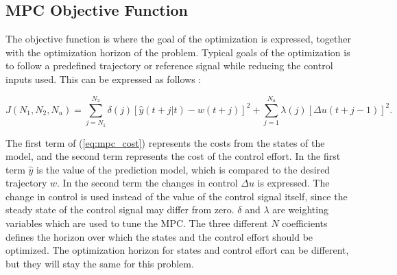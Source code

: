 \subsection{MPC Objective Function}

The objective function is where the goal of the optimization is expressed, together with the optimization horizon of the problem. Typical goals of the optimization is to follow a predefined trajectory or reference signal while reducing the control inputs used. This can be expressed as follows \cite{mpcCAMACHO}:

\begin{equation}
	\label{eq:mpc_cost}
	J(N_1, N_2, N_u) = \sum_{j=N_1}^{N_2} \delta(j)[\hat{y}(t+j|t)-w(t+j)]^2 + 
	\sum_{j=1}^{N_u}\lambda(j)[\Delta u(t+j-1)]^2.
\end{equation}

The first term of (\ref{eq:mpc_cost}) represents the costs from the states of the model, and the second term represents the cost of the control effort. In the first term $\hat{y}$ is the value of the prediction model, which is compared to the desired trajectory $w$. In the second term the changes in control $\Delta u$ is expressed. The change in control is used instead of the value of the control signal itself, since the steady state of the control signal may differ from zero. $\delta$ and $\lambda$ are weighting variables which are used to tune the MPC. The three different $N$ coefficients defines the horizon over which the states and the control effort should be optimized. The optimization horizon for states and control effort can be different, but they will stay the same for this problem.